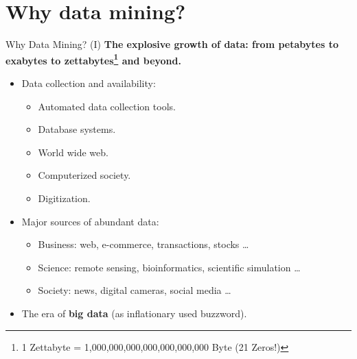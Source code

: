 \section{Why data mining?}

\begin{frame}{Why Data Mining? (I)}
	\textbf{The explosive growth of data: from petabytes to exabytes to zettabytes\footnote{1 Zettabyte = 1,000,000,000,000,000,000,000 Byte (21 Zeros!)} and
		beyond.}\\
	\begin{itemize}
		\item Data collection and availability:
		      \begin{itemize}
			      \item Automated data collection tools.
			      \item Database systems.
			      \item World wide web.
			      \item Computerized society.
			      \item Digitization.
		      \end{itemize}
		\item Major sources of abundant data:
		      \begin{itemize}
			      \item Business: web, e-commerce, transactions, stocks \ldots
			      \item Science: remote sensing, bioinformatics, scientific
			            simulation \ldots
			      \item Society: news, digital cameras, social media \ldots
		      \end{itemize}
		\item The era of \textbf{big data} (as inflationary used buzzword).
	\end{itemize}
\end{frame}

